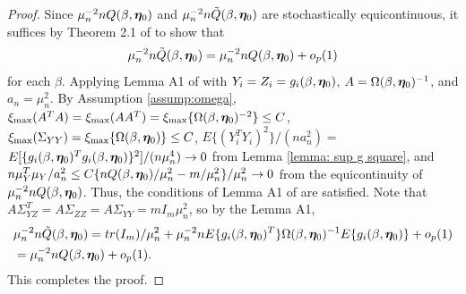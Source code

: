 \documentclass[12pt]{article}
\begin{document}
{\begin{proof}
Since $\mu_n^{-2}n Q(\beta,\bm \eta_0) $ and $\mu_n^{-2} n \tilde Q(\beta, \bm \eta_0)$ are stochastically equicontinuous, it suffices by Theorem 2.1 of \cite{Newey1991} to show that 
\[
\mu_n^{-2}n \tilde Q(\beta, \bm \eta_0)= \mu_n^{-2}n  Q(\beta, \bm \eta_0) +o_p(1)
\]
for each $\beta$. Applying Lemma A1 of \cite{Newey:2009aa} with $Y_i=Z_i=g_i(\beta, \bm \eta_0)$, $A= \Omega(\beta, \bm \eta_0)^{-1}$, and $a_n=\mu_n^2$. By Assumption \ref{assump:omega}, $\xi_{\max}(A^T A)=\xi_{\max}(A A^T) = \xi_{\max} \{\Omega(\beta, \bm \eta_0)^{-2} \}\leq C$, $\xi_{\max}(\Sigma_{YY}) = \xi_{\max} \{\Omega(\beta, \bm \eta_0)\}\leq C$, $E\{(Y_i^TY_i)^2\}/(na_n^2)=$\\ $ E[\{g_i(\beta, \bm \eta_0)^Tg_i(\beta, \bm \eta_0) \}^2 ]/(n\mu_n^4)\rightarrow 0$ from Lemma \ref{lemma: sup g square},   and $n\mu_Y^T\mu_Y/a_n^2\leq C \{ n Q(\beta, \bm \eta_0)/\mu_n^2- m/\mu_n^2\}/\mu_n^2\rightarrow 0 $ from the equicontinuity of $\mu_n^{-2}n Q(\beta, \bm \eta_0) $. Thus, the conditions of Lemma A1 of \cite{Newey:2009aa} are satisfied. Note that $A\Sigma_{YZ}^T = A\Sigma_{ZZ}=  A\Sigma_{YY} = mI_m\mu_n^2$, so by the Lemma A1, 
\begin{align*}
    &\mu_n^{-2} n \tilde Q(\beta, \bm \eta_0)= tr(I_m)/\mu_n^2 +\mu_n^{-2} n E\{g_i(\beta, \bm \eta_0)^T\} \Omega(\beta, \bm \eta_0)^{-1} E\{g_i(\beta, \bm \eta_0)\} + o_p(1) \\
    &= \mu_n^{-2} n Q(\beta, \bm \eta_0)+ o_p(1).
\end{align*}
This completes the proof.
\end{proof}






}
\end{document}
